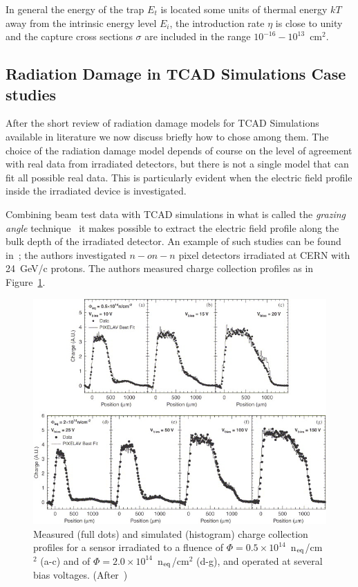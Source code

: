 In general the energy of the trap $E_t$ is located some units of thermal energy $k T$ away from the 
intrinsic energy level $E_i$, the introduction rate $\eta$ is close to unity and the 
capture cross sections $\sigma$ are included in the range $10^{-16}-10^{13}$~cm$^2$.

\subsection{Radiation Damage in TCAD Simulations Case studies}
\label{sec:Savic}

After the short review of radiation damage models for TCAD Simulations available in literature 
we now discuss briefly how to chose among them.
The choice of the radiation damage model depends of course 
on the level of agreement with real data from irradiated detectors, but there is not a single model 
that can fit all possible real data. This is particularly evident when the electric field profile inside 
the irradiated device is investigated. 

Combining beam test data with TCAD simulations in what is called the {\it grazing angle} 
technique~\cite{Henrich:687041,Lari:2001qqa,LARI2004349}  
it makes possible to extract the electric field profile along the bulk depth of the irradiated detector.
An example of such studies can be found in~\cite{Chiochia2005,CHIOCHIA2006}; the 
authors investigated $n-on-n$ pixel detectors irradiated at CERN with  24~GeV/c protons. 
The authors measured charge collection profiles as in Figure~\ref{fig:chiochia2006_profiles}. 

\begin{figure}[!htpb]
\centering
\includegraphics[width=1.00\textwidth]{chiochia2006_profiles.jpg}
\caption{\label{fig:chiochia2006_profiles}Measured (full dots) and simulated (histogram) charge collection profiles for a sensor irradiated to a fluence of $\Phi = 0.5\times10^{14}$~n$_{\rm eq}$/cm$^2$  (a-c) and of $\Phi = 2.0\times10^{14}$~n$_{\rm eq}$/cm$^2$  (d-g), and operated at several bias voltages. (After~\cite{CHIOCHIA2006})}
\end{figure}

